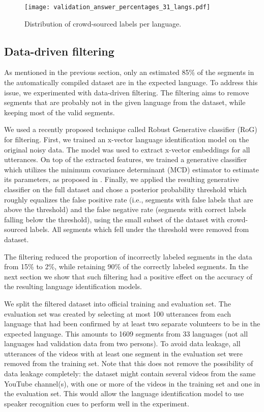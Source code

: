 \documentclass{article}
\begin{document}
\begin{figure}[tb]
  \centering
  \texttt{[image: validation\_answer\_percentages\_31\_langs.pdf]}
  \caption{Distribution of crowd-sourced labels per language.}
  \label{fig:validation_answer_percentages}
\end{figure}




\subsection{Data-driven filtering}

As mentioned in the previous section, only an estimated 85\% of the segments in the automatically compiled dataset are in the expected language. To address this issue, we experimented with data-driven filtering. The filtering aims to remove segments that are probably not in the given language from the dataset, while keeping most of the valid segments.

We used a recently proposed technique called Robust Generative classifier (RoG) \cite{lee2019robust} for filtering. First, we trained an x-vector \cite{snyder2018x} language identification model on the original noisy data. The model was used to extract x-vector embeddings for all utterances. On top of the extracted features, we trained a generative classifier which utilizes the minimum covariance determinant (MCD) estimator to estimate its parameters, as proposed in \cite{lee2019robust}. Finally, we applied the resulting generative classifier on the full dataset and chose a posterior probability threshold which roughly equalizes the false positive rate (i.e., segments with false labels that are above the threshold) and the false negative rate (segments with correct labels falling below the threshold), using the small subset of the dataset with crowd-sourced labels. All segments which fell under the threshold were removed from dataset.

The filtering reduced the proportion of incorrectly labeled segments in the data from 15\% to 2\%, while retaining 90\% of the correctly labeled segments. In the next section we show that such filtering had a positive effect on the accuracy of the resulting language identification models.

We split the filtered dataset into official training and evaluation set. The evaluation set was created by selecting at most 100 utterances from each language that had been confirmed by at least two separate volunteers to be in the expected language. This amounts to 1609 segments from 33 languages (not all languages had validation data from two persons). To avoid data leakage, all utterances of the videos with at least one segment in the evaluation set were removed from the training set. Note that this does not remove the possibility of data leakage completely: the dataset might contain several videos from the same YouTube channel(s), with one or more of the videos in the training set and one in the evaluation set. This would allow the language identification model to use speaker recognition cues to perform well in the experiment. 
\end{document}
